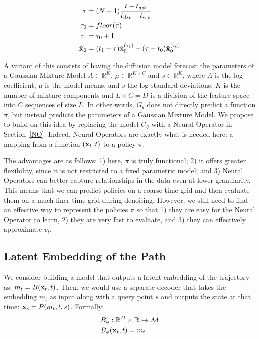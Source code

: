 \begin{align*}
    \tau & = (N - 1) \frac{t - t_{dst}}{t_{dst} - t_{src}} \\
    \tau_0 & = floor(\tau) \\
    \tau_1 & = \tau_0 + 1 \\
    \tilde{\mathbf{x}}_0 & = (t_1 - \tau)\hat{\mathbf{x}}^{(\tau_1)}_0 + (\tau - t_0)\hat{\mathbf{x}}^{(\tau_0)}_0
\end{align*}

\noindent A variant of this consists of having the diffusion model forecast the parameters of a Gaussian Mixture Model $A \in \mathbb{R}^{K}$, $\mu \in \mathbb{R}^{K \times C}$ and $s \in \mathbb{R}^{K}$, where $A$ is the log coefficient, $\mu$ is the model means, and $s$ the log standard deviations. $K$ is the number of mixture components and $L \times C = D$ is a division of the feature space into $C$ sequences of size $L$. In other words, $G_{\theta}$ does not directly predict a function $\pi$, but instead predicts the parameters of a Gaussian Mixture Model. We propose to build on this idea by replacing the model $G_{\theta}$ with a Neural Operator in Section~\ref{NO}. Indeed, Neural Operators are exactly what is needed here: a mapping from a function $(\mathbf{x}_t, t)$ to a policy $\pi$.

The advantages are as follows: 1) here, $\pi$ is truly functional; 2) it offers greater flexibility, since it is not restricted to a fixed parametric model; and 3) Neural Operators can better capture relationships in the data even at lower granularity. This means that we can predict policies on a coarse time grid and then evaluate them on a much finer time grid during denoising. However, we still need to find an effective way to represent the policies $\pi$ so that 1) they are easy for the Neural Operator to learn, 2) they are very fast to evaluate, and 3) they can effectively approximate $v_t$.

\subsection{Latent Embedding of the Path}

We consider building a model that outputs a latent embedding of the trajectory as: $m_t = B(\mathbf{x}_t, t)$. Then, we would use a separate decoder that takes the embedding $m_t$ as input along with a query point $s$ and outputs the state at that time: $\mathbf{x}_s = P(m_t, t, s)$. Formally:
\begin{align*}
    & B_{\phi} : \mathbb{R}^{D} \times \mathbb{R} \mapsto \mathcal{M} \\
    & B_{\phi}(\mathbf{x}_t, t) = m_t
\end{align*}

